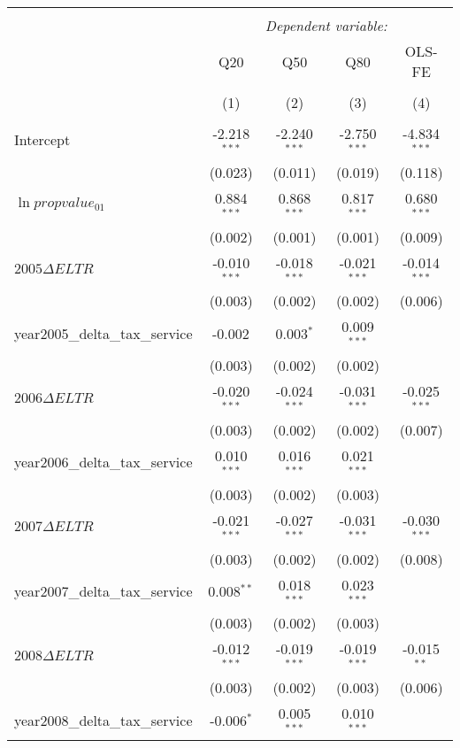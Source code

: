 \begin{table}[!htbp] \centering
\begin{tabular}{@{\extracolsep{5pt}}lcccc}
\\[-1.8ex]\hline
\hline \\[-1.8ex]
& \multicolumn{4}{c}{\textit{Dependent variable:}} \
\cr \cline{4-5}
\\[-1.8ex] & \multicolumn{1}{c}{Q20} & \multicolumn{1}{c}{Q50} & \multicolumn{1}{c}{Q80} & \multicolumn{1}{c}{OLS-FE}  \\
\\[-1.8ex] & (1) & (2) & (3) & (4) \\
\hline \\[-1.8ex]
 Intercept & -2.218$^{***}$ & -2.240$^{***}$ & -2.750$^{***}$ & -4.834$^{***}$ \\
  & (0.023) & (0.011) & (0.019) & (0.118) \\
 $\ln{propvalue_{01}}$ & 0.884$^{***}$ & 0.868$^{***}$ & 0.817$^{***}$ & 0.680$^{***}$ \\
  & (0.002) & (0.001) & (0.001) & (0.009) \\
 $2005\Delta ELTR$ & -0.010$^{***}$ & -0.018$^{***}$ & -0.021$^{***}$ & -0.014$^{***}$ \\
  & (0.003) & (0.002) & (0.002) & (0.006) \\
 year2005_delta_tax_service & -0.002$^{}$ & 0.003$^{*}$ & 0.009$^{***}$ & \\
  & (0.003) & (0.002) & (0.002) & \\
 $2006\Delta ELTR$ & -0.020$^{***}$ & -0.024$^{***}$ & -0.031$^{***}$ & -0.025$^{***}$ \\
  & (0.003) & (0.002) & (0.002) & (0.007) \\
 year2006_delta_tax_service & 0.010$^{***}$ & 0.016$^{***}$ & 0.021$^{***}$ & \\
  & (0.003) & (0.002) & (0.003) & \\
 $2007\Delta ELTR$ & -0.021$^{***}$ & -0.027$^{***}$ & -0.031$^{***}$ & -0.030$^{***}$ \\
  & (0.003) & (0.002) & (0.002) & (0.008) \\
 year2007_delta_tax_service & 0.008$^{**}$ & 0.018$^{***}$ & 0.023$^{***}$ & \\
  & (0.003) & (0.002) & (0.003) & \\
 $2008\Delta ELTR$ & -0.012$^{***}$ & -0.019$^{***}$ & -0.019$^{***}$ & -0.015$^{**}$ \\
  & (0.003) & (0.002) & (0.003) & (0.006) \\
 year2008_delta_tax_service & -0.006$^{*}$ & 0.005$^{***}$ & 0.010$^{***}$ & \\

\end{tabular}
\end{table}
